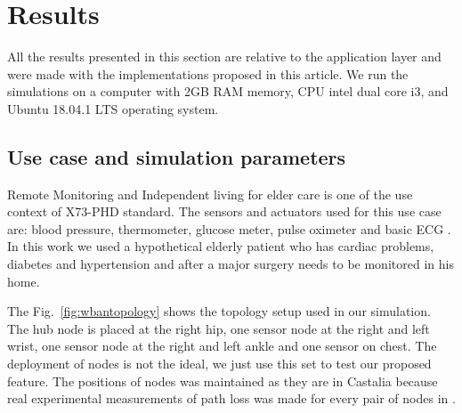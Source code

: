 \section{Results}\label{results}
All the results presented in this section are relative to the application layer and were made with the implementations proposed in this article. We run the simulations on a computer with 2GB RAM memory, CPU intel dual core i3, and Ubuntu 18.04.1 LTS operating system.

\subsection{Use case and simulation parameters}

Remote Monitoring and Independent living for elder care is one of the use context of X73-PHD standard. The sensors and actuators used for this use case are: blood pressure, thermometer, glucose meter, pulse oximeter and basic ECG  \cite{b3}. In this work we used a hypothetical elderly patient who has cardiac problems, diabetes and hypertension and after a major surgery needs to be monitored in his home.

The Fig.~\ref{fig:wbantopology} shows the topology setup used in our simulation. The hub node is placed at the right hip, one sensor node at the right and left wrist, one sensor node at the right and left ankle and one sensor on chest. The deployment of nodes is not the ideal, we just use this set to test our proposed feature. The positions of nodes was maintained as they are in Castalia because real experimental measurements of path loss was made for every pair of nodes in \cite{b4}.


